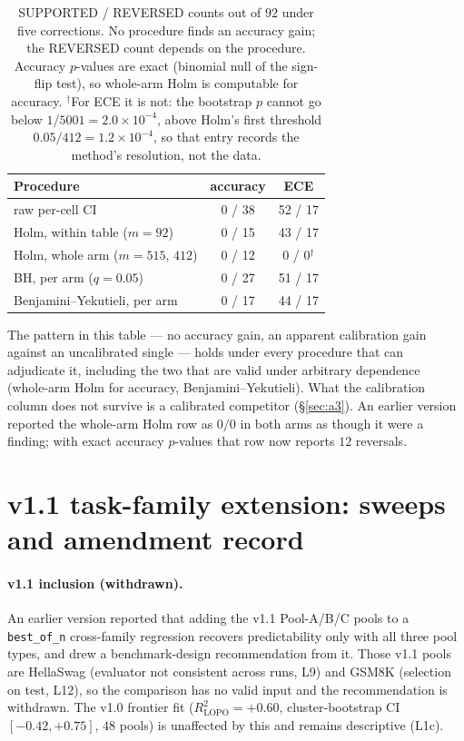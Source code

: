 \documentclass[11pt]{article}
\begin{document}
\begin{table}[h]
\centering\small
\setlength{\tabcolsep}{4pt}
\caption{SUPPORTED / REVERSED counts out of $92$ under five corrections. No procedure finds an accuracy gain; the REVERSED count depends on the procedure. Accuracy $p$-values are exact (binomial null of the sign-flip test), so whole-arm Holm is computable for accuracy. $^{\dagger}$For ECE it is not: the bootstrap $p$ cannot go below $1/5001{=}2.0\times10^{-4}$, above Holm's first threshold $0.05/412{=}1.2\times10^{-4}$, so that entry records the method's resolution, not the data.}
\label{tab:correction}
\begin{tabular}{@{}lcc@{}}
\toprule
Procedure & accuracy & ECE \\
\midrule
raw per-cell CI              & 0 / 38 & 52 / 17 \\
Holm, within table ($m{=}92$)  & 0 / 15 & 43 / 17 \\
Holm, whole arm ($m{=}515$, $412$) & 0 / 12  & 0 / 0$^{\dagger}$  \\
BH, per arm ($q{=}0.05$)       & 0 / 27 & 51 / 17 \\
Benjamini--Yekutieli, per arm  & 0 / 17 & 44 / 17 \\
\bottomrule
\end{tabular}
\end{table}

The pattern in this table --- no accuracy gain, an apparent calibration gain against an uncalibrated single --- holds under every procedure that can adjudicate it, including the two that are valid under arbitrary dependence (whole-arm Holm for accuracy, Benjamini--Yekutieli). What the calibration column does not survive is a calibrated competitor (\S\ref{sec:a3}). An earlier version reported the whole-arm Holm row as $0/0$ in both arms as though it were a finding; with exact accuracy $p$-values that row now reports $12$ reversals.

\section{v1.1 task-family extension: sweeps and amendment record}\label{app:v11}

\paragraph{v1.1 inclusion (withdrawn).} An earlier version reported that adding the v1.1 Pool-A/B/C pools to a \texttt{best\_of\_n} cross-family regression recovers predictability only with all three pool types, and drew a benchmark-design recommendation from it. Those v1.1 pools are HellaSwag (evaluator not consistent across runs, L9) and GSM8K (selection on test, L12), so the comparison has no valid input and the recommendation is withdrawn. The v1.0 frontier fit ($R^2_{\text{LOPO}}{=}{+}0.60$, cluster-bootstrap CI $[{-}0.42, {+}0.75]$, $48$ pools) is unaffected by this and remains descriptive (L1c).
\end{document}
